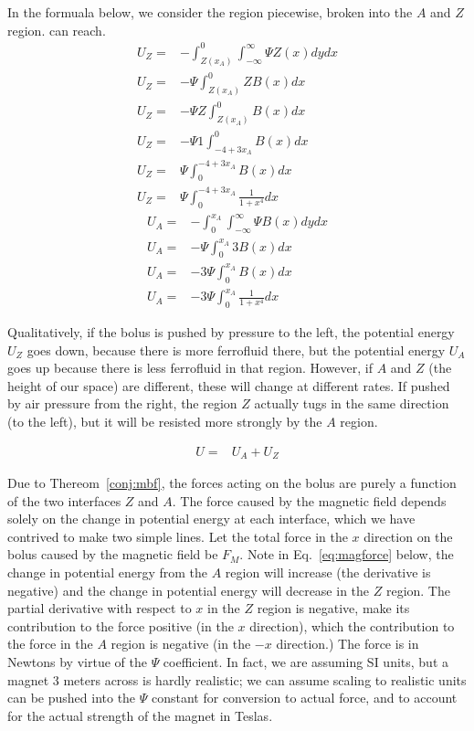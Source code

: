 \documentclass{asme2ej}
\begin{document}
In the formuala below, we consider the region piecewise,
broken into the $A$ and $Z$ region.
can reach.
\begin{align}
  U_Z = & -\int_{Z(x_A)}^0 \int_{-\infty}^{\infty}  \Psi Z(x) dy dx \\
  U_Z = & -\Psi\int_{Z(x_A)}^0 Z B(x)  dx  \\
  U_Z = & - \Psi Z \int_{Z(x_A)}^0 B(x)  dx \\
  U_Z = & - \Psi 1 \int_{ -4 + 3x_A}^0 B(x) dx \\
  U_Z = &  \Psi  \int_{0}^{ -4 + 3x_A} B(x) dx \\
  U_Z = &  \Psi  \int_{0}^{ -4 + 3x_A} \frac{1}{1+x^4} dx
\end{align}
\begin{align}
  U_A = &  -\int_0^{x_A} \int_{-\infty}^{\infty} \Psi B(x) dy dx \\
  U_A = &  -\Psi\int_0^{x_A} 3 B(x) dx \\
  U_A = &  -3 \Psi \int_0^{x_A} B(x) dx \\
  U_A = &  -3 \Psi \int_0^{x_A} \frac{1}{1+x^4} dx
\end{align}

Qualitatively, if the bolus is pushed by pressure to the left, the potential energy $U_Z$
goes down, because there is more ferrofluid there, but the potential energy $U_A$ goes up
because there is less ferrofluid in that region. However, if $A$ and $Z$ (the height of our space)
are different, these will change at different rates. If pushed by air pressure from the
right, the region $Z$ actually tugs in the same direction (to the left), but it
will be resisted more strongly by the $A$ region.

\begin{align}
  U = & U_A + U_Z
\end{align}


Due to Thereom~\ref{conj:mbf}, the forces acting on the bolus are purely a function
of the two interfaces $Z$ and $A$.
The force caused by the magnetic field depends solely on the change in potential energy
at each interface, which we have contrived to make two simple lines.
Let the total force in the $x$ direction on the bolus caused by the magnetic
field be $F_M$. Note in Eq.~\ref{eq:magforce} below, the change in potential energy
from the $A$ region will increase (the derivative is negative) and
the change in potential energy will decrease in the $Z$ region.
The partial derivative with respect to $x$ in the $Z$ region is negative, make its contribution
to the force positive (in the $x$ direction), which the contribution to the force
in the $A$ region is negative (in the $-x$ direction.) The force is in Newtons by virtue
of the $\Psi$ coefficient. In fact, we are assuming SI units, but a magnet 3 meters across
is hardly realistic; we can assume scaling to realistic units can be pushed into the $\Psi$
constant for conversion to actual force, and to account for the actual strength of the magnet in Teslas.
\end{document}
